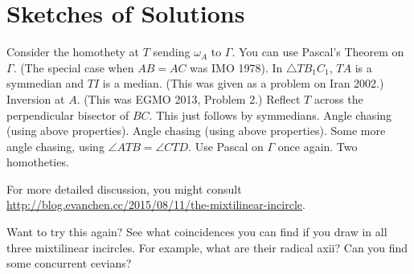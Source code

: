 \documentclass[11pt]{scrartcl}
\begin{document}
\section{Sketches of Solutions}
\begin{enumerate}
  \ii Consider the homothety at $T$ sending $\omega_A$ to $\Gamma$.
  \ii You can use Pascal's Theorem on $\Gamma$.
  (The special case when $AB=AC$ was IMO 1978).
  \ii In $\triangle TB_1C_1$, $TA$ is a symmedian and $TI$ is a median.
  (This was given as a problem on Iran 2002.)
  \ii Inversion at $A$. (This was EGMO 2013, Problem 2.)
  \ii Reflect $T$ across the perpendicular bisector of $BC$.
  \ii This just follows by symmedians.
  \ii Angle chasing (using above properties).
  \ii Angle chasing (using above properties).
  \ii Some more angle chasing, using $\angle ATB = \angle CTD$.
  \ii Use Pascal on $\Gamma$ once again.
  \ii Two homotheties.
\end{enumerate}
For more detailed discussion, you might consult \url{http://blog.evanchen.cc/2015/08/11/the-mixtilinear-incircle}.

\vspace{2em}
Want to try this again?
See what coincidences you can find if you draw in all three mixtilinear incircles.
For example, what are their radical axii?
Can you find some concurrent cevians?
\end{document}
